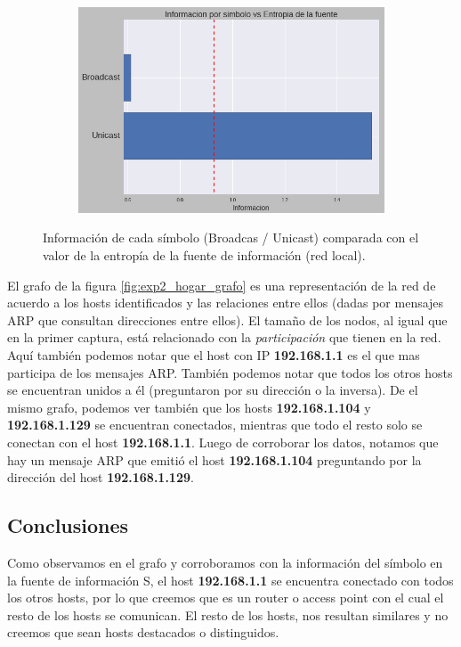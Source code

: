 \begin{figure}[h]
  \begin{subfigure}{.5\textwidth}
    \includegraphics[width=\textwidth]{imagenes/hogarenia/brvsun_informaciones_vs_entropia.png}
  \end{subfigure}
  \label{fig:exp2_hogar_brvsun_infovsentro}
  \caption{Información de cada símbolo (Broadcas / Unicast) comparada con el valor de la entropía de la fuente de información (red local).}
\end{figure}

\par El grafo de la figura \ref{fig:exp2_hogar_grafo} es una representación de la red de acuerdo a los hosts identificados y las relaciones entre ellos (dadas por mensajes ARP que consultan direcciones entre ellos). El tamaño de los nodos, al igual que en la primer captura, está relacionado con la \textit{participación} que tienen en la red. Aquí también podemos notar que el host con IP \textbf{192.168.1.1} es el que mas participa de los mensajes ARP. También podemos notar que todos los otros hosts se encuentran unidos a él (preguntaron por su dirección o la inversa). De el mismo grafo, podemos ver también que los hosts \textbf{192.168.1.104} y \textbf{192.168.1.129} se encuentran conectados, mientras que todo el resto solo se conectan con el host \textbf{192.168.1.1}. Luego de corroborar los datos, notamos que hay un mensaje ARP que emitió el host \textbf{192.168.1.104} preguntando por la dirección del host \textbf{192.168.1.129}.

\subsection{Conclusiones}

\par Como observamos en el grafo y corroboramos con la información del símbolo en la fuente de información S, el host \textbf{192.168.1.1} se encuentra conectado con todos los otros hosts, por lo que creemos que es un router o access point con el cual el resto de los hosts se comunican. El resto de los hosts, nos resultan similares y no creemos que sean hosts destacados o distinguidos.
